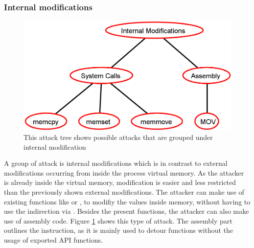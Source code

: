 \subsubsection{Internal modifications}
\label{sec:internal_modifications}
\begin{figure}[h]
\centering
\includegraphics[scale=0.45]{sections/adtrees/InternalModificationsWithoutDefenses.png}
\caption{This attack tree shows possible attacks that are grouped under internal modification}
\label{fig:attacks_internal}
\end{figure}
A group of attack is internal modifications which is in contrast to external modifications occurring from inside the process virtual memory. As the attacker is already inside the virtual memory, modification is easier and less restricted than the previously shown external modifications. The attacker can make use of existing functions like  or , to modifiy the values inside memory, without having to use the indirection via . Besides the present  functions, the attacker can also make use of assembly code. Figure \ref{fig:attacks_internal} shows this type of attack. The assembly part outlines the  instruction, as it is mainly used to detour functions without the usage of exported API functions.